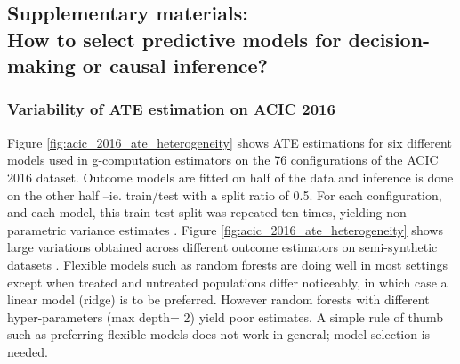 \documentclass[11pt]{article}
\let\cite=\supercite
\begin{document}
\begin{appendices}

    \part*{Supplementary materials:\\
        How to select predictive models for decision-making or causal inference? }

    \setcounter{secnumdepth}{3}



    \section{Variability of ATE estimation on ACIC
      2016}\label{apd:toy_example:acic_2016_ate_variability}

    Figure \ref{fig:acic_2016_ate_heterogeneity} shows ATE estimations for six
    different models used in g-computation estimators on the 76 configurations of
    the ACIC 2016 dataset. Outcome models are fitted on half of the data and
    inference is done on the other half --ie. train/test with a split ratio of 0.5.
    For each configuration, and each model, this train test split was repeated ten
    times, yielding non parametric variance estimates
    \cite{bouthillier_accounting_2021}. Figure \ref{fig:acic_2016_ate_heterogeneity}
    shows large variations obtained across different outcome estimators on
    semi-synthetic datasets \cite{dorie_automated_2019}. Flexible models such as
    random forests are doing well in most settings except when treated and untreated
    populations differ noticeably, in which case a linear model (ridge) is to be
    preferred. However random forests with different hyper-parameters (max depth= 2)
    yield poor estimates. A simple rule of thumb such as preferring flexible models
    does not work in general; model selection is needed.



\end{appendices}
\end{document}
